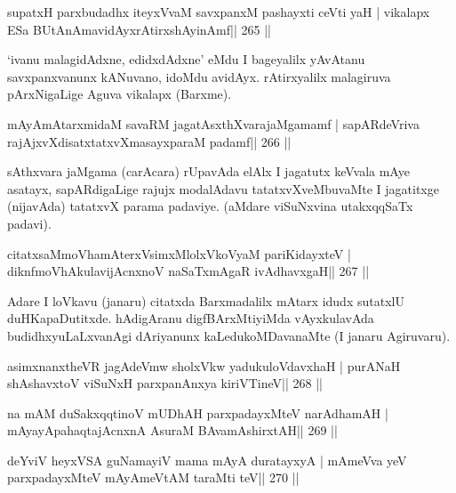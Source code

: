 \begin{shl}
supatxH parxbudadhx iteyxVvaM savxpanxM pashayxti ceVti yaH |
vikalapx ESa BUtAnAmavidAyxrAtirxshAyinAmf\hfill || 265 ||
\end{shl}

\begin{artha}
`ivanu malagidAdxne, edidxdAdxne' eMdu I bageyalilx yAvAtanu  savxpanxvanunx kANuvano, idoMdu avidAyx. rAtirxyalilx malagiruva pArxNigaLige Aguva vikalapx (Barxme).
\end{artha}


\begin{shl}
mAyAmAtarxmidaM savaRM jagatAsxthXvarajaMgamamf |
sapARdeVriva rajAjxvXdisatxtatxvXmasayxparaM padamf\hfill || 266 ||
\end{shl}

\begin{artha}
sAthxvara jaMgama (carAcara) rUpavAda elAlx I jagatutx keVvala mAye 
asatayx, sapARdigaLige rajujx modalAdavu tatatxvXveMbuvaMte I 
jagatitxge (nijavAda) tatatxvX parama padaviye. (aMdare viSuNxvina utakxqqSaTx padavi).
\end{artha}

\begin{shl}
citatxsaMmoVhamAterxVsimxMlolxVkoV\s yaM pariKidayxteV |
diknfmoVhAkulavijAcnxnoV naSaTxmAgaR ivAdhavxgaH\hfill || 267 ||
\end{shl}

\begin{artha}
Adare I loVkavu (janaru) citatxda Barxmadalilx mAtarx idudx sutatxlU  duHKapaDutitxde. hAdigAranu digfBArxMtiyiMda vAyxkulavAda budidhxyuLaLxvanAgi dAriyanunx kaLedukoMDavanaMte (I janaru Agiruvaru).
\end{artha}

\begin{shl}
asimxnanxtheVR jagAdeVmw sholxVkw yadukuloVdavxhaH |
purANaH shAshavxtoV viSuNxH parxpanAnxya kiriVTineV\hfill || 268 ||
\end{shl}

\begin{shl}
na mAM duSakxqqtinoV mUDhAH parxpadayxMteV narAdhamAH |
mAyayA\s pahaqtajAcnxnA AsuraM BAvamAshirxtAH\hfill || 269 ||
\end{shl}

\begin{shl}
deYviV heyxVSA guNamayiV mama mAyA duratayxyA |
mAmeVva yeV parxpadayxMteV mAyAmeVtAM taraMti teV\hfill || 270 ||
\end{shl}

